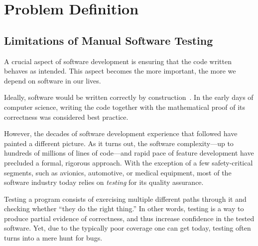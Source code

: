 \section{Problem Definition}

\subsection{Limitations of Manual Software Testing}


A crucial aspect of software development is ensuring that the code written behaves as intended.  This aspect becomes the more important, the more we depend on software in our lives.


Ideally, software would be written correctly by construction~\cite{dijkstra1976discipline}.  In the early days of computer science, writing the code together with the mathematical proof of its correctness was considered best practice.

However, the decades of software development experience that followed have painted a different picture.  As it turns out, the software complexity---up to hundreds of millions of lines of code---and rapid pace of feature development have precluded a formal, rigorous approach.
%
With the exception of a few safety-critical segments, such as avionics, automotive, or medical equipment, most of the software industry today relies on \emph{testing} for its quality assurance.


Testing a program consists of exercising multiple different paths through it and checking whether ``they do the right thing.''  In other words, testing is a way to produce partial evidence of correctness, and thus increase confidence in the tested software.  Yet, due to the typically poor coverage one can get today, testing often turns into a mere hunt for bugs.

